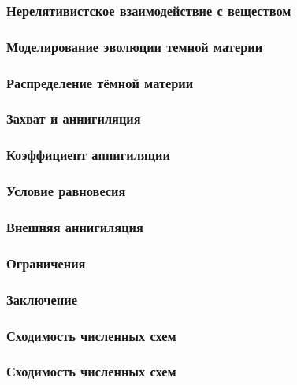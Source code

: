 	\begin{frame}
		\frametitle{Нерелятивистское взаимодействие с веществом}
		
	\end{frame}
	
	\begin{frame}
		\frametitle{Моделирование эволюции темной материи}
		
	\end{frame}
	
	

	
	\begin{frame}
		\frametitle{Распределение тёмной материи}
		
	\end{frame}
	\begin{frame}
		\frametitle{Захват и аннигиляция}
		
	\end{frame}
	
	
	\begin{frame}
		\frametitle{Коэффициент аннигиляции}
		
	\end{frame}
	
	
	\begin{frame}
		\frametitle{Условие равновесия}
		
	\end{frame}
	
	\begin{frame}
		\frametitle{Внешняя аннигиляция}
		
	\end{frame}
	
	\begin{frame}
		\frametitle{Ограничения}
		
	\end{frame}
	
	\begin{frame}
		\frametitle{Заключение}
		
	\end{frame}
	\begin{frame}
		
	\end{frame}
	
	\begin{frame}
		\frametitle{Сходимость численных схем}
		
	\end{frame}
	\begin{frame}
		\frametitle{Сходимость численных схем}
		
	\end{frame}
 

